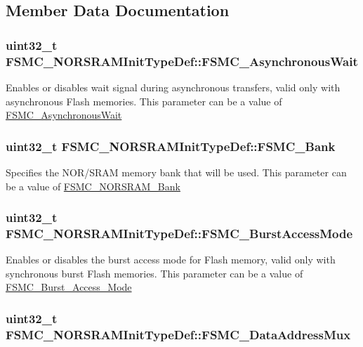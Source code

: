\subsection{Member Data Documentation}
\hypertarget{structFSMC__NORSRAMInitTypeDef_ac350cc34377fe3d5f882a6801bab1ac9}{
\subsubsection[{FSMC\_\-AsynchronousWait}]{\setlength{\rightskip}{0pt plus 5cm}uint32\_\-t {\bf FSMC\_\-NORSRAMInitTypeDef::FSMC\_\-AsynchronousWait}}}
\label{structFSMC__NORSRAMInitTypeDef_ac350cc34377fe3d5f882a6801bab1ac9}
Enables or disables wait signal during asynchronous transfers, valid only with asynchronous Flash memories. This parameter can be a value of \hyperlink{group__FSMC__AsynchronousWait}{FSMC\_\-AsynchronousWait} \hypertarget{structFSMC__NORSRAMInitTypeDef_a7fcd864461cf0d1cf83b62fa2b4d3f86}{
\subsubsection[{FSMC\_\-Bank}]{\setlength{\rightskip}{0pt plus 5cm}uint32\_\-t {\bf FSMC\_\-NORSRAMInitTypeDef::FSMC\_\-Bank}}}
\label{structFSMC__NORSRAMInitTypeDef_a7fcd864461cf0d1cf83b62fa2b4d3f86}
Specifies the NOR/SRAM memory bank that will be used. This parameter can be a value of \hyperlink{group__FSMC__NORSRAM__Bank}{FSMC\_\-NORSRAM\_\-Bank} \hypertarget{structFSMC__NORSRAMInitTypeDef_aec0bfff5c934c251c21450a50f5bdb79}{
\subsubsection[{FSMC\_\-BurstAccessMode}]{\setlength{\rightskip}{0pt plus 5cm}uint32\_\-t {\bf FSMC\_\-NORSRAMInitTypeDef::FSMC\_\-BurstAccessMode}}}
\label{structFSMC__NORSRAMInitTypeDef_aec0bfff5c934c251c21450a50f5bdb79}
Enables or disables the burst access mode for Flash memory, valid only with synchronous burst Flash memories. This parameter can be a value of \hyperlink{group__FSMC__Burst__Access__Mode}{FSMC\_\-Burst\_\-Access\_\-Mode} \hypertarget{structFSMC__NORSRAMInitTypeDef_af4ff95085d3bb39e34c2f88ca3140ce5}{
\subsubsection[{FSMC\_\-DataAddressMux}]{\setlength{\rightskip}{0pt plus 5cm}uint32\_\-t {\bf FSMC\_\-NORSRAMInitTypeDef::FSMC\_\-DataAddressMux}}}

